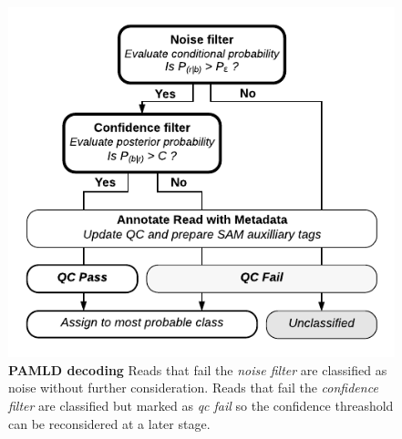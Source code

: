 \documentclass[10pt,twocolumn]{article}
\begin{document}
\begin{figure}[htbp]
\centering
\includegraphics[keepaspectratio,scale=1]{pamld}
\caption{\footnotesize{\textbf{PAMLD decoding} Reads that fail the \emph{noise filter} are classified as noise without further consideration. Reads that fail the \emph{confidence filter} are classified but marked as \emph{qc fail} so the confidence threashold can be reconsidered at a later stage.} }
\label{fig:18}
\end{figure}
\end{document}
